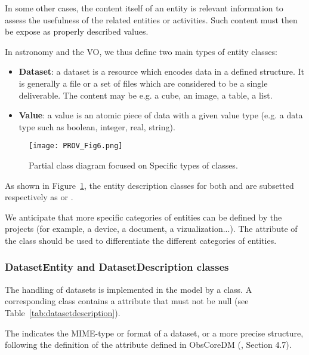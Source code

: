 In some other cases, the content itself of an entity is relevant information to assess the usefulness of the related entities or activities. Such content must then be expose as properly described values.

In astronomy and the VO, we thus define two main types of entity classes:

\begin{itemize}
    \item \textbf{Dataset}: a dataset is a resource which encodes data in a defined structure. It is generally a file or a set of files which are considered to be a single deliverable. The content may be e.g. a cube, an image, a table, a list.
    \item \textbf{Value}: a value is an atomic piece of data with a given value type (e.g. a data type such as boolean, integer, real, string).
\end{itemize}

\begin{figure}[ht]
\centering
\texttt{[image: PROV\_Fig6.png]}
\caption[Partial class diagram focused on specific types of  classes.]{Partial class diagram focused on Specific types of  classes.}
\label{fig:classdiagram_entityclasses}
\end{figure}

As shown in Figure~\ref{fig:classdiagram_entityclasses}, the entity description classes for both  and  are subsetted respectively as  or .

We anticipate that more specific categories of entities can be defined by the projects (for example, a device, a document, a vizualization...). The  attribute of the  class should be used to differentiate the different categories of entities.


\subsubsection{DatasetEntity and DatasetDescription classes}

The handling of datasets is implemented in the model by a  class. A corresponding  class contains a  attribute that must not be null (see Table~\ref{tab:datasetdescription}).

The  indicates the MIME-type or format of a dataset, or a more precise structure, following the definition of the attribute  defined in ObsCoreDM (\citet{2017ivoa.spec.0509L}, Section 4.7).

